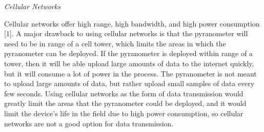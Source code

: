 \documentclass[10pt,draftclsnofoot,onecolumn,letterpaper]{article}
\begin{document}
    {\fontsize{10pt}{12.0pt}\textit{Cellular Networks}\\\selectfont 
    \par}\par
    {\fontsize{10pt}{12.0pt}Cellular networks offer high range, high bandwidth, and high power consumption [1]. A major drawback to using cellular networks is that the pyranometer will need to be in range of a cell tower, which limits the areas in which the pyranometer can be deployed. If the pyranometer is deployed within range of a tower, then it will be able upload large amounts of data to the internet quickly, but it will consume a lot of power in the process. The pyranometer is not meant to upload large amounts of data, but rather upload small samples of data every few seconds. Using cellular networks as the form of data transmission would greatly limit the areas that the pyranometer could be deployed, and it would limit the device's life in the field due to high power consumption, so cellular networks are not a good option for data transmission.\\\selectfont 
    \par}\par
    
\end{document}
